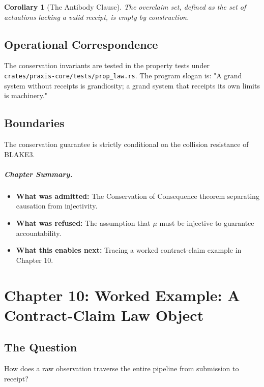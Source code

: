 \documentclass[11pt,oneside]{book}
\theoremstyle{definition}
\theoremstyle{plain}
\newtheorem{corollary}[theorem]{Corollary}
\theoremstyle{remark}
\newcommand{\muop}{\mu}                        %
\newcommand{\code}[1]{\texttt{#1}}
\begin{document}
\begin{corollary}[The Antibody Clause]\label{cor:antibody_clause}
The overclaim set, defined as the set of actuations lacking a valid receipt, is empty by construction. %
\end{corollary}

\section{Operational Correspondence}
The conservation invariants are tested in the property tests under \code{crates/praxis-core/tests/prop\_law.rs}. %
The program slogan is: "A grand system without receipts is grandiosity; a grand system that receipts its own limits is machinery." %

\section{Boundaries}
The conservation guarantee is strictly conditional on the collision resistance of BLAKE3. %

\paragraph{Chapter Summary.}
\begin{itemize}
  \item \textbf{What was admitted:} The Conservation of Consequence theorem separating causation from injectivity. %
  \item \textbf{What was refused:} The assumption that $\muop$ must be injective to guarantee accountability. %
  \item \textbf{What this enables next:} Tracing a worked contract-claim example in Chapter 10. %
\end{itemize}

\chapter{Chapter 10: Worked Example: A Contract-Claim Law Object}
\label{ch:worked_example}

\section{The Question}
How does a raw observation traverse the entire pipeline from submission to receipt? %
\end{document}
